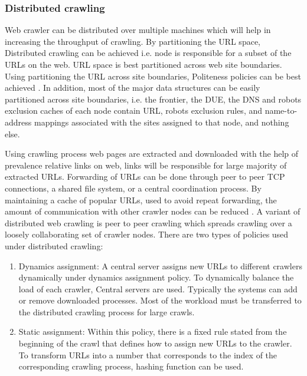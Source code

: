 \documentclass[article,type=msc,colorback,accentcolor=tud9c,twoside,11pt]{tudthesis}
\begin{document}
\subsubsection{Distributed crawling}

Web crawler can be distributed over multiple machines which will help in increasing the throughput of crawling. By partitioning the URL space, Distributed crawling can be achieved  i.e. node is responsible for a subset of the URLs on the web. URL space is best partitioned across web site boundaries. Using partitioning the URL across site boundaries, Politeness policies can be best achieved . In addition, most of the major data structures can be easily partitioned across site boundaries, i.e. the frontier, the DUE, the DNS and robots exclusion caches of each node contain URL, robots exclusion rules, and name-to-address mappings associated with the sites assigned to that node, and nothing else.

Using crawling process web pages are extracted and downloaded  with the help of prevalence relative links on web, links will be responsible for large majority of extracted URLs. Forwarding of URLs can be done through peer to peer TCP connections\cite{Highperformancewebcrawling}, a shared file system\cite{Highperformance}, or a central coordination process\cite{anatomy}. By maintaining a cache of popular URLs, used to avoid repeat forwarding\cite{Graphstructure}, the amount of communication with other crawler nodes can be reduced . A variant of distributed web crawling is peer to peer crawling which spreads crawling over a loosely collaborating set of crawler nodes. There are two types of policies used under distributed crawling:
 \begin{enumerate}
	\item Dynamics assignment: A central server assigns new URLs to different crawlers dynamically under dynamics assignment policy. To dynamically balance the load of each crawler, Central servers are used. Typically the systems can add or remove downloaded processes. Most of the workload must be transferred to the distributed crawling process for large crawls.
	\item Static assignment: Within this policy, there is a fixed rule stated from the beginning of the crawl that defines how to assign new URLs to the crawler. To transform URLs into a number that corresponds to the index of the corresponding crawling process, hashing function can be used.
\end{enumerate}
\end{document}
